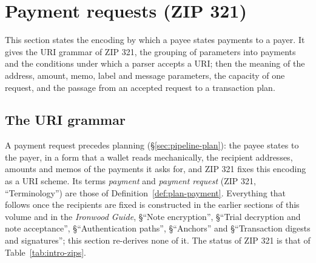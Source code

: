\documentclass[11pt,a4paper]{article}
\theoremstyle{definition}
\begin{document}
\section{Payment requests (ZIP 321)}\label{sec:zip321}

This section states the encoding by which a payee states payments to a
payer. It gives the URI grammar of ZIP 321, the grouping of parameters into
payments and the conditions under which a parser accepts a URI; then the
meaning of the address, amount, memo, label and message parameters, the
capacity of one request, and the passage from an accepted request to a
transaction plan.

\subsection{The URI grammar}\label{sec:zip321-uri}

A payment request precedes planning (\S\ref{sec:pipeline-plan}): the payee
states to the payer, in a form that a wallet reads mechanically, the
recipient addresses, amounts and memos of the payments it asks for, and ZIP
321 fixes this encoding as a URI scheme. Its terms \emph{payment} and
\emph{payment request} (ZIP 321, ``Terminology'') are those of
Definition~\ref{def:plan-payment}. Everything that follows once the
recipients are fixed is constructed in the earlier sections of this volume
and in the \emph{Ironwood Guide}, \S``Note encryption'', \S``Trial
decryption and note acceptance'', \S``Authentication paths'',
\S``Anchors'' and \S``Transaction digests and signatures''; this section
re-derives none of it. The status of ZIP 321 is that of
Table~\ref{tab:intro-zips}.
\end{document}
